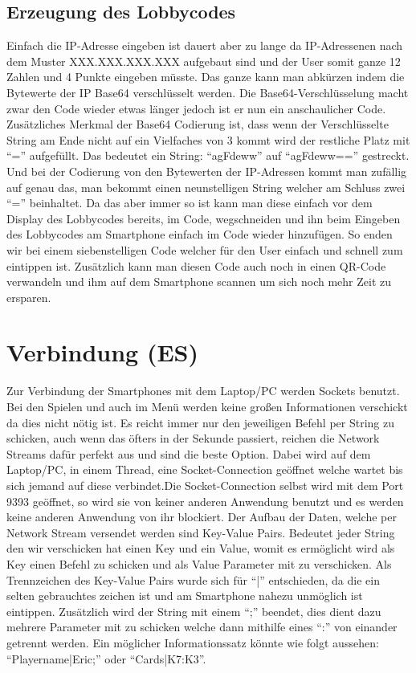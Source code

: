 \subsection{Erzeugung des Lobbycodes}
Einfach die IP-Adresse eingeben ist dauert aber zu lange da IP-Adressenen nach dem Muster XXX.XXX.XXX.XXX aufgebaut sind und der User somit ganze 12 Zahlen und 4 Punkte eingeben müsste. Das ganze kann man abkürzen indem die Bytewerte der IP Base64 verschlüsselt werden. Die Base64-Verschlüsselung macht zwar den Code wieder etwas länger jedoch ist er nun ein anschaulicher Code. Zusätzliches Merkmal der Base64 Codierung ist, dass wenn der Verschlüsselte String am Ende nicht auf ein Vielfaches von 3 kommt wird der restliche Platz mit “=” aufgefüllt. Das bedeutet ein String: “agFdeww” auf “agFdeww==” gestreckt. Und bei der Codierung von den Bytewerten der IP-Adressen kommt man zufällig auf genau das, man bekommt einen neunstelligen String welcher am Schluss zwei “=” beinhaltet. Da das aber immer so ist kann man diese einfach vor dem Display des Lobbycodes bereits, im Code, wegschneiden und ihn beim Eingeben des Lobbycodes am Smartphone einfach im Code wieder hinzufügen. So enden wir bei einem siebenstelligen Code welcher für den User einfach und schnell zum eintippen ist. Zusätzlich kann man diesen Code auch noch in einen QR-Code verwandeln und ihm auf dem Smartphone scannen um sich noch mehr Zeit zu ersparen.
\section{Verbindung (ES)}
Zur Verbindung der Smartphones mit dem Laptop/PC werden Sockets benutzt. Bei den Spielen und auch im Menü werden keine großen Informationen verschickt da dies nicht nötig ist. Es reicht immer nur den jeweiligen Befehl per String zu schicken, auch wenn das öfters in der Sekunde passiert, reichen die Network Streams dafür perfekt aus und sind die beste Option. Dabei wird auf dem Laptop/PC, in einem Thread, eine Socket-Connection geöffnet welche wartet bis sich jemand auf diese verbindet.Die Socket-Connection selbst wird mit dem Port 9393 geöffnet, so wird sie von keiner anderen Anwendung benutzt und es werden keine anderen Anwendung von ihr blockiert. Der Aufbau der Daten, welche per Network Stream versendet werden sind Key-Value Pairs. Bedeutet jeder String den wir verschicken hat einen Key und ein Value, womit es ermöglicht wird als Key einen Befehl zu schicken und als Value Parameter mit zu verschicken. Als Trennzeichen des Key-Value Pairs wurde sich für “|” entschieden, da die ein selten gebrauchtes zeichen ist und am Smartphone nahezu unmöglich ist eintippen. Zusätzlich wird der String mit einem “;” beendet, dies dient dazu mehrere Parameter mit zu schicken welche dann mithilfe eines “:” von einander getrennt werden. Ein möglicher Informationssatz könnte wie folgt aussehen: “Playername|Eric;” oder “Cards|K7:K3”.
